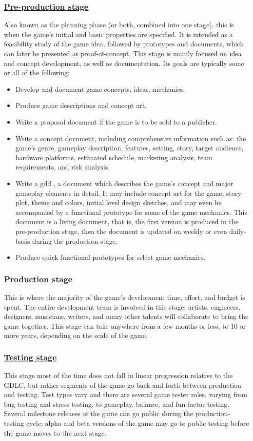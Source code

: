 \documentclass[../main.tex]{subfiles}
\begin{document}
\subsubsection*{\underline{Pre-production stage}}
Also known as the planning phase (or both, combined into one stage), this is when the game’s initial and basic properties are specified. It is intended as a feasibility study of the game idea, followed by prototypes and documents, which can later be presented as proof-of-concept. This stage is mainly focused on idea and concept development, as well as documentation. Its goals are typically some or all of the following:
\begin{itemize}
    \item Develop and document game concepts, ideas, mechanics.
    \item Produce game descriptions and concept art.
    \item Write a proposal document if the game is to be sold to a publisher.
    \item Write a concept document, including comprehensive information such as:  the game's genre, gameplay description, features, setting, story, target audience, hardware platforms, estimated schedule, marketing analysis, team requirements, and risk analysis.
    \item Write a \acrfull{gdd} , a document which describes the game’s concept and major gameplay elements in detail. It may include concept art for the game, story plot, theme and colors, initial level design sketches, and may even be accompanied by a functional prototype for some of the game mechanics. This document is a living document, that is, the first version is produced in the pre-production stage, then the document is updated on weekly or even daily-basis during the production stage.
    \item Produce quick functional prototypes for select game mechanics.
\end{itemize}
\subsubsection*{\underline{Production stage}}
This is where the majority of the game’s development time, effort, and budget is spent. The entire development team is involved in this stage; artists, engineers, designers, musicians, writers, and many other talents will collaborate to bring the game together. This stage can take anywhere from a few months or less, to 10 or more years, depending on the scale of the game.
\subsubsection*{\underline{Testing stage}}
This stage most of the time does not fall in linear progression relative to the GDLC, but rather segments of the game go back and forth between production and testing. Test types vary and there are several game tester roles, varying from bug testing and stress testing, to gameplay, balance, and fun-factor testing. Several milestone releases of the game can go public during the production-testing cycle; alpha and beta versions of the game may go to public testing before the game moves to the next stage.
\end{document}
